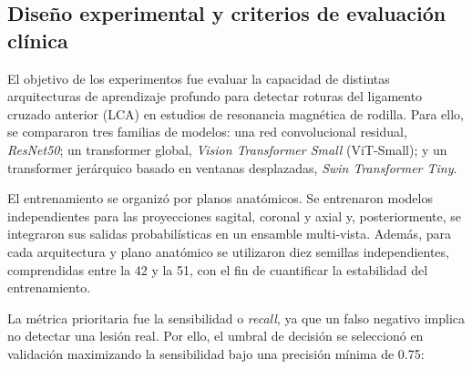 
\subsection{Diseño experimental y criterios de evaluación clínica}
\label{subsec:diseno_experimental_resultados}

El objetivo de los experimentos fue evaluar la capacidad de distintas arquitecturas de aprendizaje profundo para detectar roturas del ligamento cruzado anterior (LCA) en estudios de resonancia magnética de rodilla. Para ello, se compararon tres familias de modelos: una red convolucional residual, \textit{ResNet50}; un transformer global, \textit{Vision Transformer Small} (ViT-Small); y un transformer jerárquico basado en ventanas desplazadas, \textit{Swin Transformer Tiny}.

El entrenamiento se organizó por planos anatómicos. Se entrenaron modelos independientes para las proyecciones sagital, coronal y axial y, posteriormente, se integraron sus salidas probabilísticas en un ensamble multi-vista. Además, para cada arquitectura y plano anatómico se utilizaron diez semillas independientes, comprendidas entre la 42 y la 51, con el fin de cuantificar la estabilidad del entrenamiento.

La métrica prioritaria fue la sensibilidad o \textit{recall}, ya que un falso negativo implica no detectar una lesión real. Por ello, el umbral de decisión se seleccionó en validación maximizando la sensibilidad bajo una precisión mínima de 0.75:

